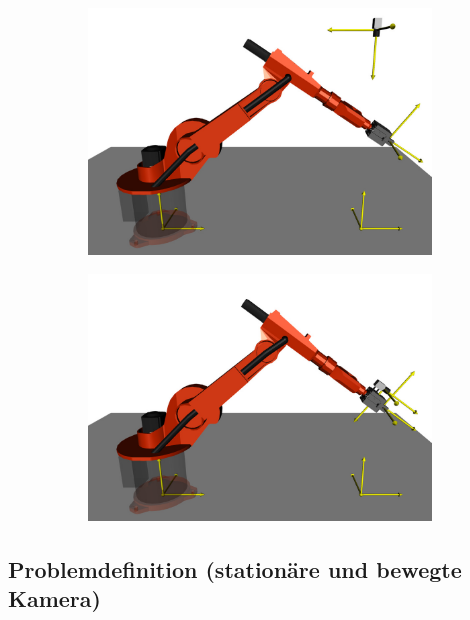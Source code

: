\documentclass[11pt]{article}
\begin{document}
\begin{figure}[h!]
    \begin{subfigure}[c]{0.5\textwidth}
        \includegraphics[width=\linewidth]{images/stationaere_kamera.png}
    \end{subfigure}%
    \begin{subfigure}[c]{0.5\textwidth}
        \includegraphics[width=\linewidth]{images/bewegte_kamera.png}
    \end{subfigure}
\end{figure}

\subsection{Problemdefinition (stationäre und bewegte Kamera)}
\end{document}
